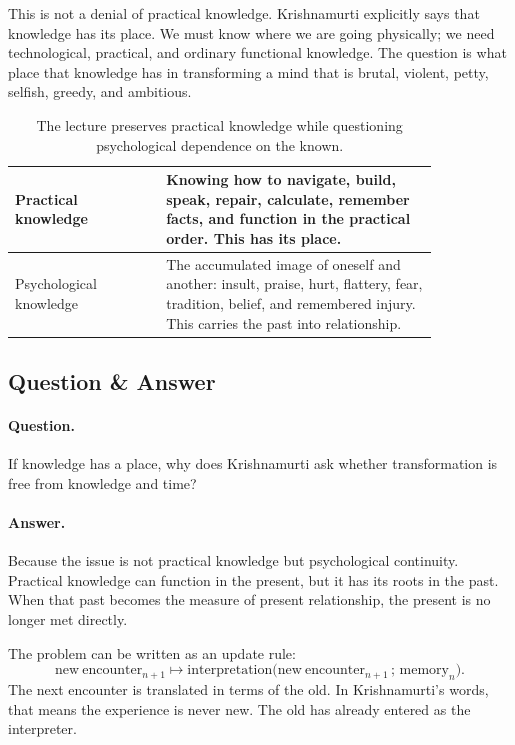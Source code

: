 This is not a denial of practical knowledge. Krishnamurti explicitly says that knowledge has its place. We must know where we are going physically; we need technological, practical, and ordinary functional knowledge. The question is what place that knowledge has in transforming a mind that is brutal, violent, petty, selfish, greedy, and ambitious.

\begin{table}
\centering
\begin{tabular}{|p{0.30\linewidth}|p{0.54\linewidth}|}
\hline
Practical knowledge & Knowing how to navigate, build, speak, repair, calculate, remember facts, and function in the practical order. This has its place.\\
\hline
Psychological knowledge & The accumulated image of oneself and another: insult, praise, hurt, flattery, fear, tradition, belief, and remembered injury. This carries the past into relationship.\\
\hline
\end{tabular}
\caption{The lecture preserves practical knowledge while questioning psychological dependence on the known.}
\end{table}

\subsection{Question \& Answer}

\paragraph{Question.}
If knowledge has a place, why does Krishnamurti ask whether transformation is free from knowledge and time?

\paragraph{Answer.}
Because the issue is not practical knowledge but psychological continuity. Practical knowledge can function in the present, but it has its roots in the past. When that past becomes the measure of present relationship, the present is no longer met directly.

The problem can be written as an update rule:
\begin{equation}
\mathrm{new\ encounter}_{n+1}
\longmapsto
\mathrm{interpretation}\bigl(\mathrm{new\ encounter}_{n+1}\,;\,\mathrm{memory}_{n}\bigr).
\end{equation}
The next encounter is translated in terms of the old. In Krishnamurti's words, that means the experience is never new. The old has already entered as the interpreter.

